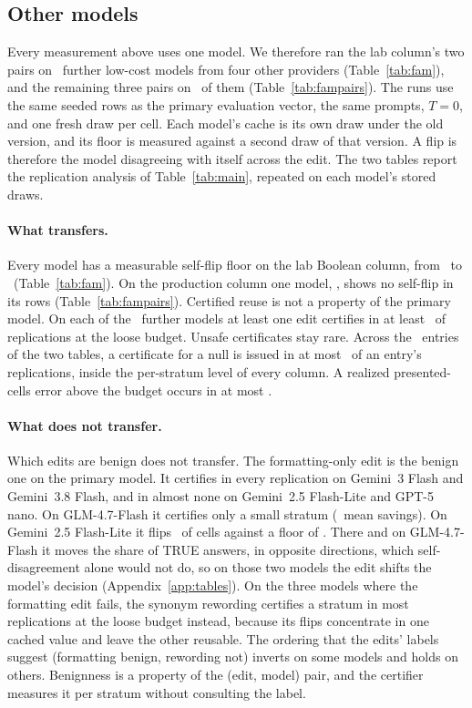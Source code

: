 \keepheading
\subsection{Other models}
\label{sec:exp-families}

Every measurement above uses one model. We therefore ran the lab
column's two pairs on \famCountWord\ further low-cost models from four
other providers (Table~\ref{tab:fam})\ifnum{}\relax,
and the remaining three pairs on \famFivePairFamiliesWord\ of them
(Table~\ref{tab:fampairs})\fi. The runs use the same seeded rows as the
primary evaluation vector, the same prompts, $T{=}0$, and one fresh draw
per cell. Each model's cache is its own draw under the old version, and
its floor is measured against a second draw of that version. A flip is
therefore the model disagreeing with itself across the edit. The two tables report the replication analysis of
Table~\ref{tab:main}, repeated on each model's stored draws.

\keeprunin
\paragraph{What transfers.} Every model has a measurable self-flip
floor on the lab Boolean column, from \famFloorLo\ to \famFloorHi\
(Table~\ref{tab:fam}). On the production column one model,
\famZeroFloorModel, shows no self-flip in its rows
(Table~\ref{tab:fampairs}).
Certified reuse is not a property of the primary model. On each of the
\famCountWord\ further models at least one edit certifies in at least
\famRepBestMin\ of replications at the loose budget. Unsafe
certificates stay rare. Across the \famRepCells\ entries of the two
tables, a certificate for a null is issued in at most
\famRepUnsafeCertMax\ of an entry's replications, inside the per-stratum
level of every column. A realized presented-cells error above the
budget occurs in at most \famRepUnsafeMax.

\keeprunin
\paragraph{What does not transfer.} Which edits are benign does not
transfer. The formatting-only edit is the benign one on the primary
model. It certifies in every replication on Gemini~3 Flash and
Gemini~3.8 Flash, and in almost none on Gemini~2.5 Flash-Lite and
GPT-5 nano. On GLM-4.7-Flash it certifies only a small stratum
(\famGlmFmtRepSavings\ mean savings). On Gemini~2.5 Flash-Lite it flips
\famGeminiFmt\ of cells against a floor of \famGeminiFloor. There and on
GLM-4.7-Flash it moves the share of TRUE answers, in opposite
directions, which self-disagreement alone would not do, so on those two
models the edit shifts the model's decision (Appendix~\ref{app:tables}).
On the three
models where the formatting edit fails, the synonym rewording certifies
a stratum in most replications at the loose budget instead, because its flips concentrate
in one cached value and leave the other reusable. The ordering that the
edits' labels suggest (formatting benign, rewording not)
inverts on some models and holds on others. Benignness is a property of
the (edit, model) pair, and the certifier measures it per stratum
without consulting the label.

